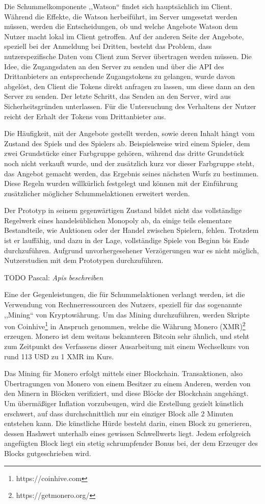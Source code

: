\documentclass[german]{cgspaper} %
\newcommand{\todo}[1]{\textit{#1}}
\newcommand{\Pascal}[1]{\textcolor{colorPascal}{TODO Pascal:} \todo{#1} }
\begin{document}
Die Schummelkomponente ,,Watson`` findet sich hauptsächlich im Client.
Während die Effekte, die Watson herbeiführt, im Server umgesetzt werden müssen, werden die Entscheidungen, ob und welche Angebote Watson dem Nutzer macht lokal im Client getroffen.
Auf der anderen Seite der Angebote, speziell bei der Anmeldung bei Dritten, besteht das Problem, dass nutzerspezifische Daten vom Client zum Server übertragen werden müssen.
Die Idee, die Zugangsdaten an den Server zu senden und über die API des Drittanbieters an entsprechende Zugangstokens zu gelangen, wurde davon abgelöst, den Client die Tokens direkt anfragen zu lassen, um diese dann an den Server zu senden.
Der letzte Schritt, das Senden an den Server, wird aus Sicherheitsgründen unterlassen. Für die Untersuchung des Verhaltens der Nutzer reicht der Erhalt der Tokens vom Drittanbieter aus.

Die Häufigkeit, mit der Angebote gestellt werden, sowie deren Inhalt hängt vom Zustand des Spiels und des Spielers ab.
Beispielsweise wird einem Spieler, dem zwei Grundstücke einer Farbgruppe gehören, während das dritte Grundstück noch nicht verkauft wurde, und der zusätzlich kurz vor dieser Farbgruppe steht, das Angebot gemacht werden, das Ergebnis seines nächsten Wurfs zu bestimmen.
Diese Regeln wurden willkürlich festgelegt und können mit der Einführung zusätzlicher möglicher Schummelaktionen erweitert werden.

Der Prototyp in seinem gegenwärtigen Zustand bildet nicht das vollständige Regelwerk eines handelsüblichen Monopoly ab, da einige teils elementare Bestandteile, wie Auktionen oder der Handel zwischen Spielern, fehlen.
Trotzdem ist er lauffähig, und dazu in der Lage, vollständige Spiele von Beginn bis Ende durchzuführen.
Aufgrund unvorhergesehener Verzögerungen war es nicht möglich, Nutzerstudien mit dem Prototypen durchzuführen.

\Pascal{Apis beschreiben}

Eine der Gegenleistungen, die für Schummelaktionen verlangt werden, ist die Verwendung von Rechnerressourcen des Nutzers, speziell für das sogenannte ,,Mining`` von Kryptowährung.
Um das Mining durchzuführen, werden Skripte von Coinhive\footnote{https://coinhive.com} in Anspruch genommen, welche die Währung Monero (XMR)\footnote{https://getmonero.org/} erzeugen.
Monero ist dem weitaus bekannteren Bitcoin sehr ähnlich, und steht zum Zeitpunkt des Verfassens dieser Ausarbeitung mit einem Wechselkurs von rund 113 USD zu 1 XMR im Kurs.

Das Mining für Monero erfolgt mittels einer Blockchain. Transaktionen, also Übertragungen von Monero von einem Besitzer zu einem Anderen, werden von den Minern in Blöcken verifiziert, und diese Blöcke der Blockchain angehängt.
Um übermäßiger Inflation vorzubeugen, wird die Erstellung gezielt künstlich erschwert, auf dass durchschnittlich nur ein einziger Block alle 2 Minuten entstehen kann.
Die künstliche Hürde besteht darin, einen Block zu generieren, dessen Hashwert unterhalb eines gewissen Schwellwerts liegt.
Jedem erfolgreich angefügten Block liegt ein stetig schrumpfender Bonus bei, der dem Erzeuger des Blocks gutgeschrieben wird.
\end{document}
